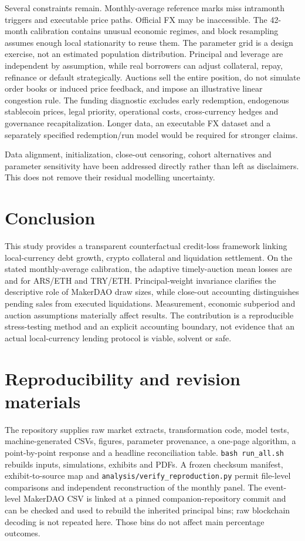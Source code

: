 \documentclass[11pt,a4paper]{article}
\begin{document}
Several constraints remain. Monthly-average reference marks miss intramonth triggers and executable price paths. Official FX may be inaccessible. The 42-month calibration contains unusual economic regimes, and block resampling assumes enough local stationarity to reuse them. The parameter grid is a design exercise, not an estimated population distribution. Principal and leverage are independent by assumption, while real borrowers can adjust collateral, repay, refinance or default strategically. Auctions sell the entire position, do not simulate order books or induced price feedback, and impose an illustrative linear congestion rule. The funding diagnostic excludes early redemption, endogenous stablecoin prices, legal priority, operational costs, cross-currency hedges and governance recapitalization. Longer data, an executable FX dataset and a separately specified redemption/run model would be required for stronger claims.

Data alignment, initialization, close-out censoring, cohort alternatives and parameter sensitivity have been addressed directly rather than left as disclaimers. This does not remove their residual modelling uncertainty.

\section{Conclusion}
This study provides a transparent counterfactual credit-loss framework linking local-currency debt growth, crypto collateral and liquidation settlement. On the stated monthly-average calibration, the adaptive timely-auction mean losses are \ArsLoss{} and \TryLoss{} for ARS/ETH and TRY/ETH. Principal-weight invariance clarifies the descriptive role of MakerDAO draw sizes, while close-out accounting distinguishes pending sales from executed liquidations. Measurement, economic subperiod and auction assumptions materially affect results. The contribution is a reproducible stress-testing method and an explicit accounting boundary, not evidence that an actual local-currency lending protocol is viable, solvent or safe.

\section*{Reproducibility and revision materials}
The repository supplies raw market extracts, transformation code, model tests, machine-generated CSVs, figures, parameter provenance, a one-page algorithm, a point-by-point response and a headline reconciliation table. \texttt{bash run\_all.sh} rebuilds inputs, simulations, exhibits and PDFs. A frozen checksum manifest, exhibit-to-source map and \texttt{analysis/verify\_reproduction.py} permit file-level comparisons and independent reconstruction of the monthly panel. The event-level MakerDAO CSV is linked at a pinned companion-repository commit and can be checked and used to rebuild the inherited principal bins; raw blockchain decoding is not repeated here. Those bins do not affect main percentage outcomes.
\end{document}
